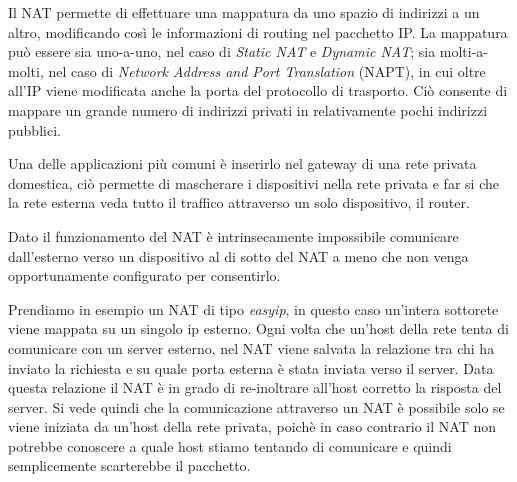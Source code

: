 Il NAT \cite{RFC_1631} permette di effettuare una mappatura da uno spazio di indirizzi a un altro, modificando così le informazioni di routing nel pacchetto IP. La mappatura può essere sia uno-a-uno, nel caso di \textit{Static NAT} e \textit{Dynamic NAT}; sia molti-a-molti, nel caso di \textit{Network Address and Port Translation} (NAPT), in cui oltre all'IP viene modificata anche la porta del protocollo di trasporto. Ciò consente di mappare un grande numero di indirizzi privati in relativamente pochi indirizzi pubblici. 

Una delle applicazioni più comuni è inserirlo nel gateway di una rete privata domestica, ciò permette di mascherare i dispositivi nella rete privata e far si che la rete esterna veda tutto il traffico attraverso un solo dispositivo, il router.

Dato il funzionamento del NAT è intrinsecamente impossibile comunicare dall'esterno verso un dispositivo al di sotto del NAT a meno che non venga opportunamente configurato per consentirlo.


Prendiamo in esempio un NAT di tipo \textit{easyip}, in questo caso un'intera sottorete viene mappata su un singolo ip esterno. Ogni volta che un'host della rete tenta di comunicare con un server esterno, nel NAT viene salvata la relazione tra chi ha inviato la richiesta e su quale porta esterna è stata inviata verso il server. Data questa relazione il NAT è in grado di re-inoltrare all'host corretto la risposta del server. Si vede quindi che la comunicazione attraverso un NAT è possibile solo se viene iniziata da un'host della rete privata, poichè in caso contrario il NAT non potrebbe conoscere a quale host stiamo tentando di comunicare e quindi semplicemente scarterebbe il pacchetto.




